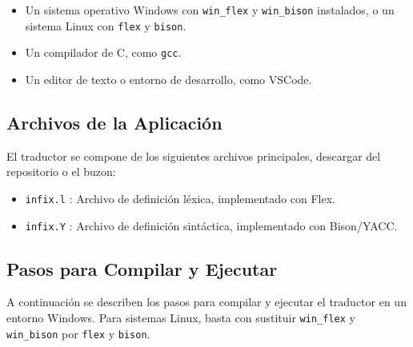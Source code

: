 \documentclass{article}
\begin{document}
\begin{itemize}
    \item Un sistema operativo Windows con \texttt{win\_flex} y \texttt{win\_bison} instalados, o un sistema Linux con \texttt{flex} y \texttt{bison}.
    \item Un compilador de C, como \texttt{gcc}.
    \item Un editor de texto o entorno de desarrollo, como VSCode.
\end{itemize}

\subsection*{Archivos de la Aplicación}

El traductor se compone de los siguientes archivos principales, descargar del repositorio o el buzon:  
\begin{itemize}
    \item \texttt{infix.l} : Archivo de definición léxica, implementado con Flex.
    \item \texttt{infix.Y} : Archivo de definición sintáctica, implementado con Bison/YACC.
\end{itemize}

\subsection*{Pasos para Compilar y Ejecutar}

A continuación se describen los pasos para compilar y ejecutar el traductor en un entorno Windows. Para sistemas Linux, basta con sustituir \texttt{win\_flex} y \texttt{win\_bison} por \texttt{flex} y \texttt{bison}.
\end{document}
